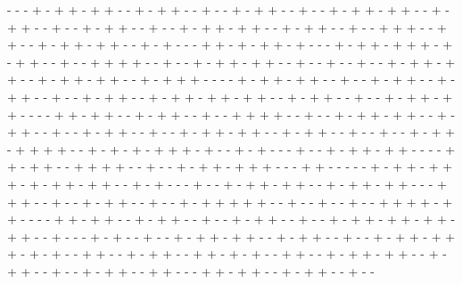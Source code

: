 - - - + - + + - + + - - + - + + - - + - - + - + + - - + - - + - + + - + + - - + - + + - - + - - + - + + - - + - - + - + + - + + - - + - + + - - + - - + + + - - + + - - + - + + - + + - - + - + - - - + + - + - + + - + - - - + - + + - + + + - + - + + - - + - - + + + + - - + - - + - + + - + + - - + - - + - - + - - + - + + - + + - - + - + + - + + - - + - + + + - - - - + - + + - + + - - + - - + - + + - - + - + + - - + - - + - + + - - + - + + - + + - + + - - + - + + - - + - - + - + + - + + - - - - + + - + + - - + - + + - - + - - + + + + - - + - - + - + + - + + - - + - + + - - + - - + - + + - - + - - + - + + - + + - - + - + + - - + - - + - - + - + + - + + + + - - + - + - + - + + + - + - - + - + - - - + - - + - + + - + + - - - - + + - + + - - + + + + - - + - - + - + + - + + + - - - + + - - - - - + - + + - + + + - + - + + - + + - - + - + - - - + - - + - + + - + + - - + - + + - + + - - - + + + - - + - - + - + + - - + - - + - + + + + + - - + - - + - - + - - + + + + - + + - - - - + + - + + - - + - + + - - + - - + - + + - - + - - + - + + - + + - + + - + + - - + - - - + - + - - + - - + - + + - + + - - + - + + - - + - - + - + + - + + + - + - + - - + + - - + - + + - - + + - + - + - - + + - - + - + + - + + - - + - + + - - + - - + - + + - - + + - - - + + - + + - - + - + + - - + - - 

